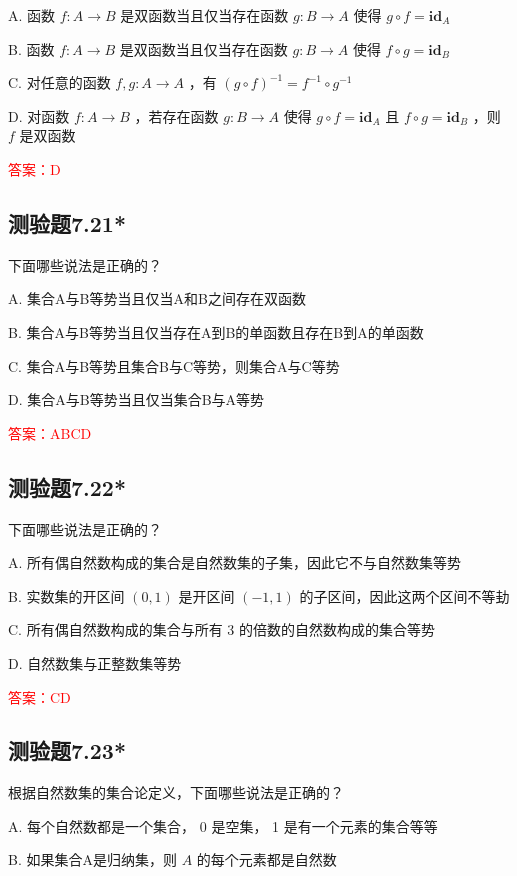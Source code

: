\documentclass[UTF8, heading=true]{ctexart}
\begin{document}
A. 函数 $f: A \rightarrow B$ 是双函数当且仅当存在函数 $g: B \rightarrow A$ 使得 $g \circ f=\mathbf{i d}_A$

B. 函数 $f: A \rightarrow B$ 是双函数当且仅当存在函数 $g: B \rightarrow A$ 使得 $f \circ g=\mathbf{i d}_B$

C. 对任意的函数 $f, g: A \rightarrow A$ ，有 $(g \circ f)^{-1}=f^{-1} \circ g^{-1}$

D. 对函数 $f: A \rightarrow B$ ，若存在函数 $g: B \rightarrow A$ 使得 $g \circ f=\mathbf{i d}_A$ 且 $f \circ g=\mathbf{i d}_B$ ，则 $f$ 是双函数


\textcolor{red}{答案：D}

\subsection{测验题7.21*}

下面哪些说法是正确的？

A. 集合A与B等势当且仅当A和B之间存在双函数

B. 集合A与B等势当且仅当存在A到B的单函数且存在B到A的单函数

C. 集合A与B等势且集合B与C等势，则集合A与C等势

D. 集合A与B等势当且仅当集合B与A等势

\textcolor{red}{答案：ABCD}

\subsection{测验题7.22*}

下面哪些说法是正确的？

A. 所有偶自然数构成的集合是自然数集的子集，因此它不与自然数集等势

B. 实数集的开区间 $(0,1)$ 是开区间 $(-1,1)$ 的子区间，因此这两个区间不等劸

C. 所有偶自然数构成的集合与所有 3 的倍数的自然数构成的集合等势

D. 自然数集与正整数集等势

\textcolor{red}{答案：CD}

\subsection{测验题7.23*}

根据自然数集的集合论定义，下面哪些说法是正确的？

A. 
每个自然数都是一个集合， 0 是空集， 1 是有一个元素的集合等等

B. 
如果集合A是归纳集，则 $A$ 的每个元素都是自然数
\end{document}
